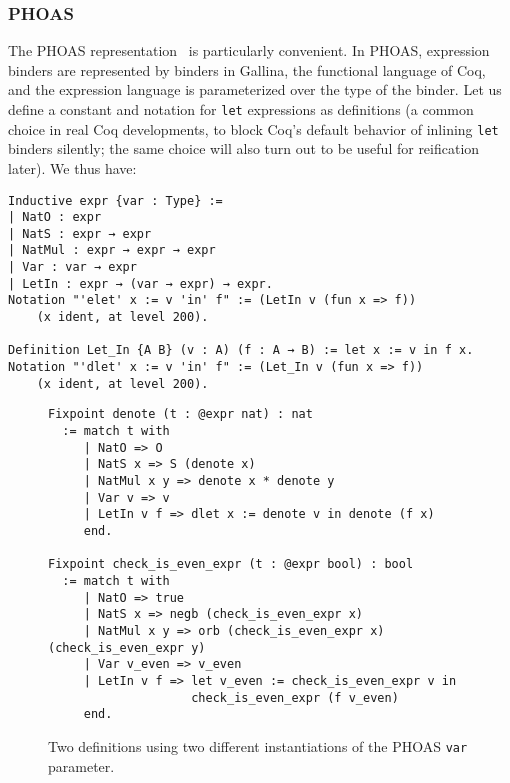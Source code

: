 \subsubsection{PHOAS} \label{sec:binders:PHOAS}

The PHOAS representation~\cite{PhoasICFP08,weak2013Ciaffaglione} is particularly convenient.
In PHOAS, expression binders are represented by binders in Gallina, the functional language of Coq, and the expression language is parameterized over the type of the binder.
Let us define a constant and notation for \texttt{let} expressions as definitions (a common choice in real Coq developments, to block Coq's default behavior of inlining \texttt{let} binders silently; the same choice will also turn out to be useful for reification later).
We thus have: \label{sec:phoas-expr-def}
\begin{verbatim}
Inductive expr {var : Type} :=
| NatO : expr
| NatS : expr → expr
| NatMul : expr → expr → expr
| Var : var → expr
| LetIn : expr → (var → expr) → expr.
Notation "'elet' x := v 'in' f" := (LetIn v (fun x => f))
    (x ident, at level 200).

Definition Let_In {A B} (v : A) (f : A → B) := let x := v in f x.
Notation "'dlet' x := v 'in' f" := (Let_In v (fun x => f))
    (x ident, at level 200).
\end{verbatim}


\begin{figure}[b!]
\centering
\begin{verbatim}
Fixpoint denote (t : @expr nat) : nat
  := match t with
     | NatO => O
     | NatS x => S (denote x)
     | NatMul x y => denote x * denote y
     | Var v => v
     | LetIn v f => dlet x := denote v in denote (f x)
     end.

Fixpoint check_is_even_expr (t : @expr bool) : bool
  := match t with
     | NatO => true
     | NatS x => negb (check_is_even_expr x)
     | NatMul x y => orb (check_is_even_expr x) (check_is_even_expr y)
     | Var v_even => v_even
     | LetIn v f => let v_even := check_is_even_expr v in
                    check_is_even_expr (f v_even)
     end.
\end{verbatim}
\caption{Two definitions using two different instantiations of the PHOAS \texttt{var} parameter.}\label{fig:denote-check-even-PHOAS}
\end{figure}


